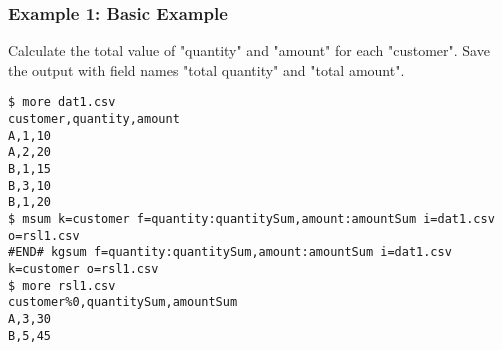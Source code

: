 \subsubsection*{Example 1: Basic Example}

Calculate the total value of "quantity" and "amount" for each "customer".  Save the output with field names "total quantity" and "total amount".


\begin{Verbatim}[baselinestretch=0.7,frame=single]
$ more dat1.csv
customer,quantity,amount
A,1,10
A,2,20
B,1,15
B,3,10
B,1,20
$ msum k=customer f=quantity:quantitySum,amount:amountSum i=dat1.csv o=rsl1.csv
#END# kgsum f=quantity:quantitySum,amount:amountSum i=dat1.csv k=customer o=rsl1.csv
$ more rsl1.csv
customer%0,quantitySum,amountSum
A,3,30
B,5,45
\end{Verbatim}
